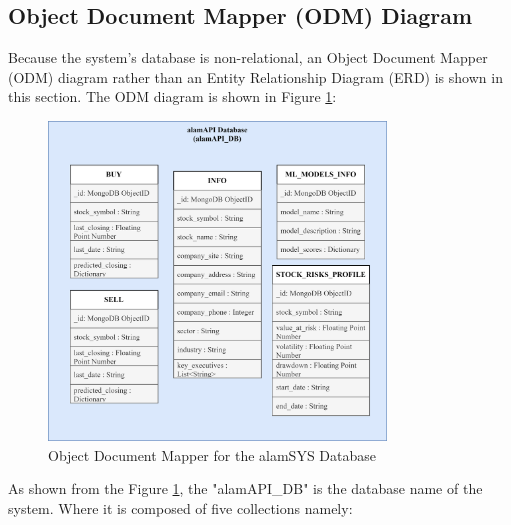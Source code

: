 \subsection{Object Document Mapper (ODM) Diagram}
\label{subsec:odm_subsec}
Because the system's database is non-relational, an Object Document Mapper (ODM) 
diagram rather than an Entity Relationship Diagram (ERD) is shown in this section.
The ODM diagram is shown in Figure \ref{fig:odm}:
\begin{figure}[ht]
    \centering
    \includegraphics[width=0.80\textwidth]{./assets/Chapter_3/ODM/ODM.png}
    \caption{Object Document Mapper for the alamSYS Database}
    \label{fig:odm}
\end{figure}
\FloatBarrier
As shown from the Figure \ref{fig:odm}, the "alamAPI\_DB" is the database
name of the system. Where it is composed of five collections namely:
